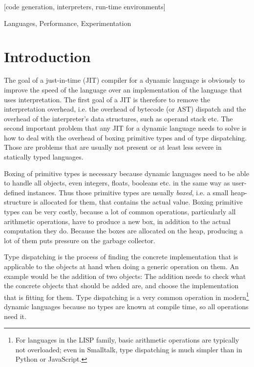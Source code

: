 \documentclass[preprint]{sigplanconf}
\begin{document}
[code generation,
interpreters, run-time environments]

\terms
Languages, Performance, Experimentation


\section{Introduction}

The goal of a just-in-time (JIT) compiler for a dynamic language is obviously to
improve the speed of the language over an implementation of the language that
uses interpretation. The first goal of a JIT is therefore to remove the
interpretation overhead, i.e. the overhead of bytecode (or AST) dispatch and the
overhead of the interpreter's data structures, such as operand stack etc. The
second important problem that any JIT for a dynamic language needs to solve is
how to deal with the overhead of boxing primitive types and of type
dispatching. Those are problems that are usually not present or at least less
severe in statically typed languages.

Boxing of primitive types is necessary because dynamic languages need to be able to handle
all objects, even integers, floats, booleans etc. in the same way as user-defined
instances. Thus those primitive types are usually \emph{boxed}, i.e. a small
heap-structure is allocated for them, that contains the actual value. Boxing
primitive types can be very costly, because a lot of common operations,
particularly all arithmetic operations, have to produce a new box, in addition
to the actual computation they do. Because the boxes are allocated on the heap,
producing a lot of them puts pressure on the garbage collector.

Type dispatching is the process of finding the concrete implementation that is
applicable to the objects at hand when doing a generic operation on them. An
example would be the addition of two objects: The addition needs to check what
the concrete objects that should be added are, and choose the implementation
that is fitting for them. Type dispatching is a very common operation in
modern\footnote{For languages in the LISP family, basic arithmetic operations
are typically not overloaded; even in Smalltalk, type dispatching is much
simpler than in Python or JavaScript.}
dynamic languages because no types are known at compile time, so all operations
need it.
\end{document}
